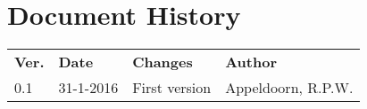 \section*{Document History}

\begin{tabular}{|p{1cm}|p{2cm}|p{7.3cm}|p{4cm}|}
\hline
\rowcolor[gray]{0.8}
\multicolumn{4}{|l|}{\bf Document History}\\
\hline
\rowcolor[gray]{0.8}
\bf Ver. & \bf Date & \bf Changes & \bf Author\\
\hline
0.1 
	& 31-1-2016
	& First version
	& Appeldoorn, R.P.W.
	\\
\hline
\end{tabular}


\vfill\eject
